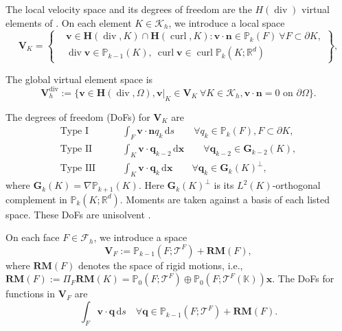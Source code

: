 \documentclass[review,hidelinks,onefignum,onetabnum]{siamart251216}
\begin{document}
The local velocity space and its degrees of freedom are the
$H(\operatorname{div})$ virtual elements of \cite{BBMR2016}.
On each element \(K\in\mathcal{K}_h\),  we introduce a local space
\begin{equation*}
\boldsymbol{V}_K = \left\{
\begin{aligned}
& \boldsymbol{v} \in \boldsymbol{H}(\operatorname{div}, K) \cap \boldsymbol{H}(\operatorname{curl}, K) : \boldsymbol{v} \cdot \boldsymbol{n} \in \mathbb{P}_k(F) \ \forall F \subset \partial K, \\
& \operatorname{div} \boldsymbol{v} \in \mathbb{P}_{k-1}(K), \ \operatorname{curl} \boldsymbol{v} \in \operatorname{curl} \mathbb{P}_k(K;\mathbb{R}^d)
\end{aligned}
\right\},
\end{equation*}

The global virtual element space is
\begin{equation*}
\boldsymbol{V}_h^{\operatorname{div}} := \{ \boldsymbol{v} \in \boldsymbol{H}(\operatorname{div}, \Omega), \boldsymbol{v}|_K \in \boldsymbol{V}_K \ \forall K \in \mathcal{K}_h, \boldsymbol{v} \cdot \boldsymbol{n} = 0 \text{ on } \partial \Omega \} .
\end{equation*}


The degrees of freedom (DoFs) for $\boldsymbol V_K$ are
\begin{align*}
\text{Type I} \qquad & \int_F \boldsymbol{v} \cdot \boldsymbol{n} q_k \, \mathrm{d}s \qquad \forall q_k \in \mathbb{P}_k(F), F \subset \partial K, \\
\text{Type II} \qquad & \int_K \boldsymbol{v} \cdot \boldsymbol{q}_{k-2} \, \mathrm{d}\boldsymbol{x} \qquad \forall \boldsymbol{q}_{k-2} \in \mathbf{G}_{k-2}(K), \\
\text{Type III} \qquad & \int_K \boldsymbol{v} \cdot \boldsymbol{q}_k \, \mathrm{d}\boldsymbol{x} \qquad \forall \boldsymbol{q}_k \in \mathbf G_k(K)^\perp,
\end{align*}
where $\mathbf G_k(K)=\nabla\mathbb P_{k+1}(K)$.
Here $\mathbf G_k(K)^\perp$ is its $L^2(K)$-orthogonal complement in
$\mathbb P_k(K;\mathbb R^d)$. Moments are taken against a basis of each
listed space. These DoFs are unisolvent \cite{BBMR2016}.

On each face \(F \in \mathcal{F}_h\), we introduce a space
$$
\boldsymbol{V}_F := \mathbb{P}_{k-1}(F;\mathscr T^F) + \mathbf{RM}(F),
$$
 where \(\mathbf{RM}(F)\) denotes the space of rigid motions, i.e., \(\mathbf{RM}(F) :=\Pi_F \mathbf{RM}(K)= \mathbb{P}_0(F; \mathscr T^F) \oplus \mathbb{P}_0(F; \mathscr T^F(\mathbb K)) \boldsymbol{x}\). The DoFs for functions in \(\boldsymbol{V}_F\) are
\[
\int_F \boldsymbol{v} \cdot \boldsymbol{q} \, \mathrm{d}s \quad \forall \boldsymbol{q} \in \mathbb{P}_{k-1}(F;\mathscr T^F) + \mathbf{RM}(F).
\]
\end{document}
